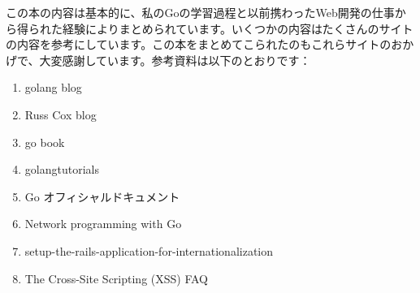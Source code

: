 この本の内容は基本的に、私のGoの学習過程と以前携わったWeb開発の仕事から得られた経験によりまとめられています。いくつかの内容はたくさんのサイトの内容を参考にしています。この本をまとめてこられたのもこれらサイトのおかげで、大変感謝しています。参考資料は以下のとおりです：

\begin{enumerate}
  \item golang blog
  \item Russ Cox blog
  \item go book
  \item golangtutorials
  \item Go オフィシャルドキュメント
  \item Network programming with Go
  \item setup-the-rails-application-for-internationalization
  \item The Cross-Site Scripting (XSS) FAQ
\end{enumerate}
